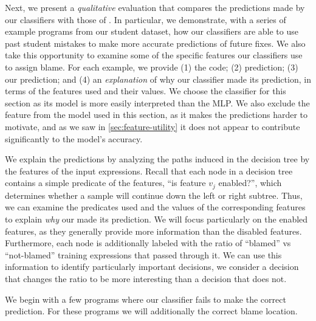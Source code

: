 \label{sec:qualitative}

Next, we present a \emph{qualitative} evaluation
that compares the predictions made by our classifiers
with those of \sherrloc.
%
In particular, we demonstrate, with a series of example programs from
our student dataset, how our classifiers are able to use past student
mistakes to make more accurate predictions of future fixes.
%
We also take this opportunity to examine some of the specific features
our classifiers use to assign blame.
%
For each example, we provide
%
(1) the code;
%
(2)  prediction;
%
(3) our  prediction; and
%
(4) an \emph{explanation} of why our classifier made its prediction, in
terms of the features used and their values.
%
We choose the \dectree classifier for this section as its model is more
easily interpreted than the MLP.\@
%
We also exclude the \ExprSize feature from the model used in this
section, as it makes the predictions harder to motivate, and as we saw
in \autoref{sec:feature-utility} it does not appear to contribute
significantly to the model's accuracy.

We explain the predictions by analyzing the paths induced in
the decision tree by the features of the input expressions.
%
Recall that each node in a decision tree contains a simple predicate of
the features, \eg ``is feature $v_j$ enabled?'', which determines
whether a sample will continue down the left or right subtree.
%
Thus, we can examine the predicates used and the values of the
corresponding features to explain \emph{why} our \dectree made its
prediction.
%
We will focus particularly on the enabled features, as they generally
provide more information than the disabled features.
%
Furthermore, each node is additionally labeled with the ratio of
``blamed'' vs ``not-blamed'' training expressions that passed through
it.
%
We can use this information to identify particularly important
decisions, \ie we consider a decision that changes the ratio to be more
interesting than a decision that does not.

%

\label{sec:failed-predictions}

We begin with a few programs where our classifier fails to
make the correct prediction.
%
For these programs we will additionally  the
correct blame location.

